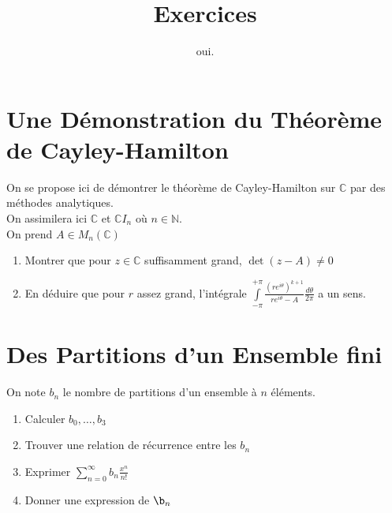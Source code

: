 \documentclass[12pt,a4paper]{report}
\title{Exercices}
\author{oui.}
\begin{document}
\maketitle
\tableofcontents
\section{Une Démonstration du Théorème de Cayley-Hamilton}\label{sec:cayley-analytique}
On se propose ici de démontrer le théorème de Cayley-Hamilton sur $\mathbb{C}$ par des méthodes analytiques.\\
On assimilera ici $\mathbb{C}$ et $\mathbb{C}I_{n}$ où $n \in \mathbb{N}$.\\
On prend $A \in M_{n}(\mathbb{C})$
\begin{enumerate}
    \item Montrer que pour $z \in \mathbb{C}$ suffisamment grand, $\det(z - A) \neq 0 $
    \item En déduire que pour $r$ assez grand, l'intégrale $\int\limits_{-\pi}^{+\pi}\frac{(re^{i\theta})^{k+1}}{re^{i\theta} - A}\frac{d\theta}{2\pi}$ a un sens.
\end{enumerate}

\section{Des Partitions d'un Ensemble fini}
On note $b_{n}$ le nombre de partitions d'un ensemble à $n$ éléments.
\begin{enumerate}
    \item Calculer $b_{0}, \dots, b_{3}$
    \item Trouver une relation de récurrence entre les $b_{n}$
    \item Exprimer $\sum\limits_{n=0}^{\infty}b_{n}\frac{x^{n}}{n!}$
    \item Donner une expression de $\b_{n}$
\end{enumerate}
\end{document}

